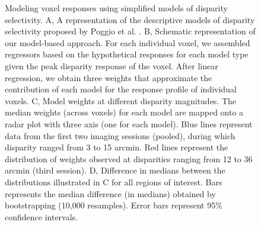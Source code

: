 \begin{figure}
  \caption[Modeling voxel responses using simplified models of disparity selectivity.]{Modeling voxel responses using simplified models of disparity selectivity. A, A representation of the descriptive models of disparity selectivity proposed by Poggio et al. \cite{Poggio:1988ij}. B, Schematic representation of our model-based approach. For each individual voxel, we assembled regressors based on the hypothetical responses for each model type given the peak disparity response of the voxel. After linear regression, we obtain three weights that approximate the contribution of each model for the response profile of individual voxels. C, Model weights at different disparity magnitudes. The median weights (across voxels) for each model are mapped onto a radar plot with three axis (one for each model). Blue lines represent data from the first two imaging sessions (pooled), during which disparity ranged from 3 to 15 arcmin. Red lines represent the distribution of weights observed at disparities ranging from 12 to 36 arcmin (third session). D, Difference in medians between the distributions illustrated in C for all regions of interest. Bars represents the median difference (in medians) obtained by bootstrapping (10,000 resamples). Error bars represent 95\% confidence intervals.}
  \label{fig:ch4fig7}
\end{figure}

